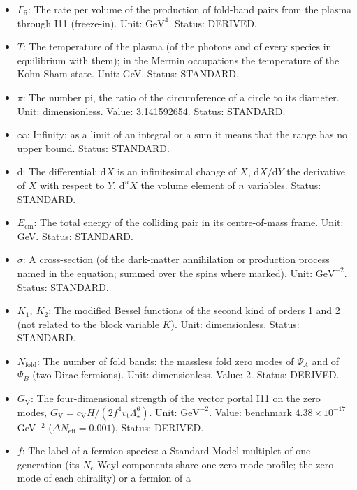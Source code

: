 \documentclass[
  10pt,
]{article}
\providecommand{\tightlist}{%
  \setlength{\itemsep}{0pt}\setlength{\parskip}{0pt}}
\begin{document}
\begin{itemize}
\tightlist
\item
  \(\Gamma_{\mathrm{fi}}\): The rate per volume of the production of
  fold-band pairs from the plasma through I11 (freeze-in). Unit:
  \(\mathrm{GeV}^{4}\). Status: DERIVED.
\item
  \(T\): The temperature of the plasma (of the photons and of every
  species in equilibrium with them); in the Mermin occupations the
  temperature of the Kohn-Sham state. Unit: GeV. Status: STANDARD.
\item
  \(\pi\): The number pi, the ratio of the circumference of a circle to
  its diameter. Unit: dimensionless. Value: 3.141592654. Status:
  STANDARD.
\item
  \(\infty\): Infinity: as a limit of an integral or a sum it means that
  the range has no upper bound. Status: STANDARD.
\item
  \(\mathrm{d}\): The differential: \(\mathrm{d}X\) is an infinitesimal
  change of \(X\), \(\mathrm{d}X/\mathrm{d}Y\) the derivative of \(X\)
  with respect to \(Y\), \(\mathrm{d}^nX\) the volume element of \(n\)
  variables. Status: STANDARD.
\item
  \(E_{\mathrm{cm}}\): The total energy of the colliding pair in its
  centre-of-mass frame. Unit: GeV. Status: STANDARD.
\item
  \(\sigma\): A cross-section (of the dark-matter annihilation or
  production process named in the equation; summed over the spins where
  marked). Unit: \(\mathrm{GeV}^{-2}\). Status: STANDARD.
\item
  \(K_1,\ K_2\): The modified Bessel functions of the second kind of
  orders 1 and 2 (not related to the block variable \(K\)). Unit:
  dimensionless. Status: STANDARD.
\item
  \(N_{\mathrm{fold}}\): The number of fold bands: the massless fold
  zero modes of \(\Psi_A\) and of \(\Psi_B\) (two Dirac fermions). Unit:
  dimensionless. Value: 2. Status: DERIVED.
\item
  \(G_{\mathrm{V}}\): The four-dimensional strength of the vector portal
  I11 on the zero modes,
  \(G_{\mathrm{V}} = c_{\mathrm{V}}H/(2f^4v_{\mathrm{t}}\Lambda_\star^6)\).
  Unit: \(\mathrm{GeV}^{-2}\). Value: benchmark \(4.38\times10^{-17}\)
  GeV\(^{-2}\) (\(\Delta N_{\mathrm{eff}} = 0.001\)). Status: DERIVED.
\item
  \(f\): The label of a fermion species: a Standard-Model multiplet of
  one generation (its \(N_{\mathrm{c}}\) Weyl components share one
  zero-mode profile; the zero mode of each chirality) or a fermion of a

\end{itemize}
\end{document}
